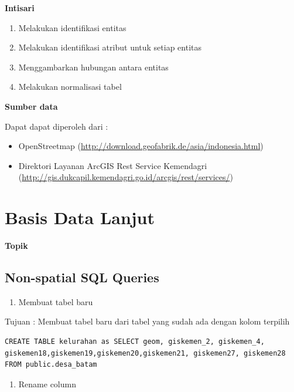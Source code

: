 \documentclass[]{book}
\providecommand{\tightlist}{%
  \setlength{\itemsep}{0pt}\setlength{\parskip}{0pt}}
\begin{document}
\textbf{Intisari}

\begin{enumerate}
\def\labelenumi{\arabic{enumi}.}
\item
  Melakukan identifikasi entitas
\item
  Melakukan identifikasi atribut untuk setiap entitas
\item
  Menggambarkan hubungan antara entitas
\item
  Melakukan normalisasi tabel
\end{enumerate}

\textbf{Sumber data}

Dapat dapat diperoleh dari :

\begin{itemize}
\item
  OpenStreetmap (\url{http://download.geofabrik.de/asia/indonesia.html})
\item
  Direktori Layanan ArcGIS Rest Service Kemendagri (\url{http://gis.dukcapil.kemendagri.go.id/arcgis/rest/services/})
\end{itemize}

\hypertarget{basis-data-lanjut}{%
\chapter{Basis Data Lanjut}\label{basis-data-lanjut}}

\textbf{Topik}

\hypertarget{non-spatial-sql-queries}{%
\section{Non-spatial SQL Queries}\label{non-spatial-sql-queries}}

\begin{enumerate}
\def\labelenumi{\arabic{enumi}.}
\tightlist
\item
  Membuat tabel baru
\end{enumerate}

Tujuan : Membuat tabel baru dari tabel yang sudah ada dengan kolom terpilih

\begin{verbatim}
CREATE TABLE kelurahan as SELECT geom, giskemen_2, giskemen_4, giskemen18,giskemen19,giskemen20,giskemen21, giskemen27, giskemen28 FROM public.desa_batam
\end{verbatim}

\begin{enumerate}
\def\labelenumi{\arabic{enumi}.}
\setcounter{enumi}{1}
\tightlist
\item
  Rename column
\end{enumerate}
\end{document}
